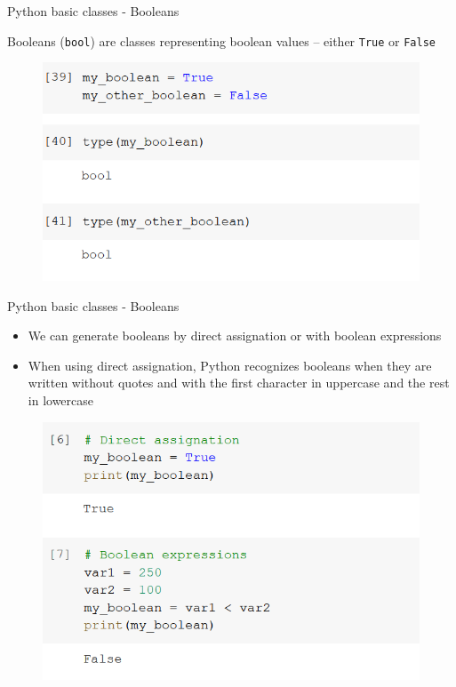 \documentclass[aspectratio=169]{beamer}
\begin{document}
\begin{frame}{Python basic classes - Booleans}

	Booleans (\texttt{bool}) are classes representing boolean values -- either \texttt{True} or \texttt{False}

	\begin{figure}
		\centering
		\includegraphics[width=0.6\linewidth]{img/bool.png}
	\end{figure}

\end{frame}

\begin{frame}{Python basic classes - Booleans}

	\begin{itemize}	
		\item We can generate booleans by direct assignation or with boolean expressions
		\item When using direct assignation, Python recognizes booleans when they are written without quotes and with the first character in uppercase and the rest in lowercase
	\end{itemize}

	\begin{figure}
		\centering
		\includegraphics[width=0.6\linewidth]{img/bool_assignation.png}
	\end{figure}

\end{frame}
\end{document}
